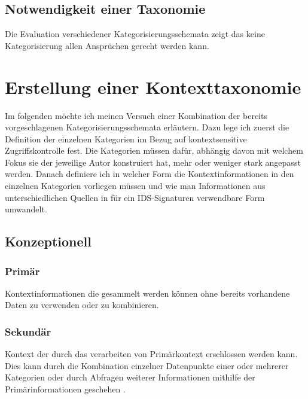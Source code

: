 \subsection{Notwendigkeit einer Taxonomie}
Die Evaluation verschiedener Kategorisierungsschemata zeigt das keine Kategorisierung allen Ansprüchen gerecht werden kann\cite{perera_context_2014}.
\section{ Erstellung einer Kontexttaxonomie }
Im folgenden möchte ich meinen Versuch einer Kombination der bereits vorgeschlagenen Kategorisierungsschemata erläutern. Dazu lege ich zuerst die Definition der einzelnen Kategorien im Bezug auf kontextsensitive Zugriffskontrolle fest. Die Kategorien müssen dafür, abhängig davon mit welchem Fokus sie der jeweilige Autor konstruiert hat, mehr oder weniger stark angepasst werden. Danach definiere ich in welcher Form die Kontextinformationen in den einzelnen Kategorien vorliegen müssen und wie man Informationen aus unterschiedlichen Quellen in für ein IDS-Signaturen verwendbare Form umwandelt.  %


\subsection{Konzeptionell}

\subsubsection{Primär}

Kontextinformationen die gesammelt werden können ohne bereits vorhandene Daten zu verwenden oder zu kombinieren. \cite{abowd_towards_1999}

\subsubsection{Sekundär}
Kontext der durch das verarbeiten von Primärkontext erschlossen werden kann. Dies kann durch die Kombination einzelner Datenpunkte einer oder mehrerer Kategorien oder durch Abfragen weiterer Informationen mithilfe der Primärinformationen geschehen \cite{abowd_towards_1999}.

